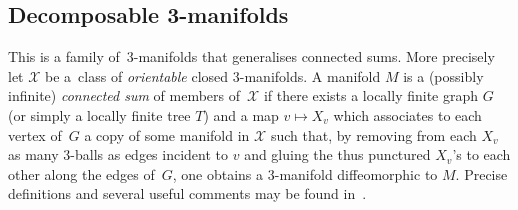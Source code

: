 \documentclass[pdftex]{sigma}
\numberwithin{equation}{section}
\begin{document}
\subsection{Decomposable 3-manifolds}\label{sec:decomposable}

This is a family of~$3$-manifolds that generalises connected sums. More precisely let $\mathcal X$ be a~class of {\it orientable }closed $3$-manifolds. A manifold $M$ is a (possibly infinite)
{\it connected sum} of members of~$\mathcal X$ if there exists a locally finite graph $G$ (or simply a locally finite tree $T$) and a map $v\mapsto X_v$ which associates to each vertex of~$G$ a copy of some manifold in $\mathcal X$ such that, by removing from each $X_v$ as many $3$-balls as edges incident to $v$ and gluing the thus punctured $X_v$'s to each other
along the edges of~$G$, one obtains a $3$-manifold diffeomorphic to $M$. Precise definitions and several useful comments may be found in~\cite{BBM}.
\end{document}
